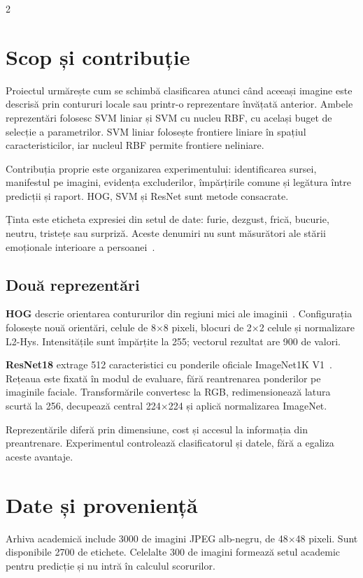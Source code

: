 \documentclass[10pt,a4paper]{article}
\begin{document}
\begin{multicols}{2}\RaggedRight
\section{Scop și contribuție}
Proiectul urmărește cum se schimbă clasificarea atunci când aceeași imagine
este descrisă prin contururi locale sau printr-o reprezentare învățată anterior.
Ambele reprezentări folosesc SVM liniar și SVM cu nucleu RBF, cu același buget
de selecție a parametrilor. SVM liniar folosește frontiere liniare în
spațiul caracteristicilor, iar nucleul RBF permite frontiere neliniare.

Contribuția proprie este organizarea experimentului: identificarea sursei,
manifestul pe imagini, evidența excluderilor, împărțirile comune și legătura
între predicții și raport. HOG, SVM și ResNet sunt metode consacrate.

Ținta este eticheta expresiei din setul de date: furie, dezgust, frică, bucurie,
neutru, tristețe sau surpriză. Aceste denumiri nu sunt măsurători ale stării
emoționale interioare a persoanei~\cite{barrett}.

\subsection{Două reprezentări}
\textbf{HOG} descrie orientarea contururilor din regiuni mici ale
imaginii~\cite{hog}. Configurația folosește nouă orientări, celule de
8$\times$8 pixeli, blocuri de 2$\times$2 celule și normalizare L2-Hys.
Intensitățile sunt împărțite la 255; vectorul rezultat are 900 de valori.

\textbf{ResNet18} extrage 512 caracteristici cu ponderile oficiale
ImageNet1K V1~\cite{resnet}. Rețeaua este fixată în modul de evaluare, fără
reantrenarea ponderilor pe imaginile faciale. Transformările convertesc la
RGB, redimensionează latura scurtă la 256, decupează central 224$\times$224
și aplică normalizarea ImageNet.

Reprezentările diferă prin dimensiune, cost și accesul la informația din
preantrenare. Experimentul controlează clasificatorul și datele, fără a
egaliza aceste avantaje.

\columnbreak
\section{Date și proveniență}
Arhiva academică include 3000 de imagini JPEG alb-negru, de 48$\times$48
pixeli. Sunt disponibile 2700 de etichete. Celelalte 300 de imagini formează
setul academic pentru predicție și nu intră în calculul scorurilor.


\end{multicols}
\end{document}

